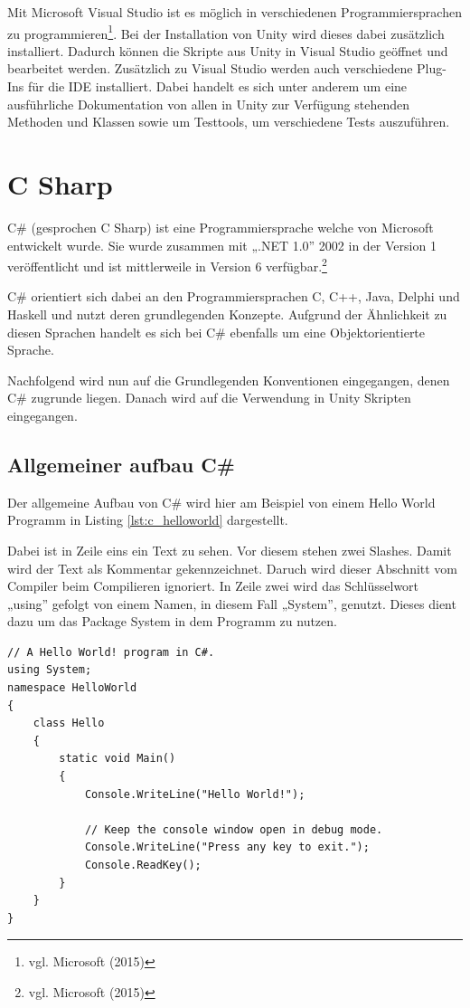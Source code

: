 	Mit Microsoft Visual Studio ist es möglich in verschiedenen Programmiersprachen zu programmieren\footnote{vgl. Microsoft \cite{microsoft1} (2015)}. Bei der Installation von Unity wird dieses dabei zusätzlich installiert. Dadurch können die Skripte aus Unity in Visual Studio geöffnet und bearbeitet werden. Zusätzlich zu Visual Studio werden auch verschiedene Plug-Ins für die IDE installiert. Dabei handelt es sich unter anderem um eine ausführliche Dokumentation von allen in Unity zur Verfügung stehenden Methoden und Klassen sowie um Testtools, um verschiedene Tests auszuführen. 

\section{C Sharp}

	C\# (gesprochen C Sharp) ist eine Programmiersprache welche von Microsoft entwickelt wurde. Sie wurde zusammen mit „.NET 1.0” 2002 in der Version 1 veröffentlicht und ist mittlerweile in Version 6 verfügbar.\footnote{vgl. Microsoft \cite{microsoft2} (2015)} 

	C\# orientiert sich dabei an den Programmiersprachen C, C++, Java, Delphi und Haskell und nutzt deren grundlegenden Konzepte. Aufgrund der Ähnlichkeit zu diesen Sprachen handelt es sich bei C\# ebenfalls um eine Objektorientierte Sprache. 

	Nachfolgend wird nun auf die Grundlegenden Konventionen eingegangen, denen C\# zugrunde liegen. Danach wird auf die Verwendung in Unity Skripten eingegangen.

\subsection{Allgemeiner aufbau C\#}

	Der allgemeine Aufbau von C\# wird hier am Beispiel von einem Hello World Programm in Listing \ref{lst:c_helloworld} dargestellt. 

	Dabei ist in Zeile eins ein Text zu sehen. Vor diesem stehen zwei Slashes. Damit wird der Text als Kommentar gekennzeichnet. Daruch wird dieser Abschnitt vom Compiler beim Compilieren ignoriert. In Zeile zwei wird das Schlüsselwort „using” gefolgt von einem Namen, in diesem Fall „System”, genutzt. Dieses dient dazu um das Package System in dem Programm zu nutzen.

	\begin{scriptsize}
	\lstset{
		float,
		caption=Hello World in C\#, 
		language=[Sharp]C, 
		frame=single,  
		showstringspaces=false, 
		showspaces=false, 
		numbers=left, 
		captionpos=b, 
		belowcaptionskip=4pt,
		basicstyle=\ttfamily
	} 
	\begin{lstlisting}[label=lst:c_helloworld]
// A Hello World! program in C#.
using System;
namespace HelloWorld
{
    class Hello 
    {
        static void Main() 
        {
            Console.WriteLine("Hello World!");

            // Keep the console window open in debug mode.
            Console.WriteLine("Press any key to exit.");
            Console.ReadKey();
        }
    }
}
	\end{lstlisting}
	\end{scriptsize}


